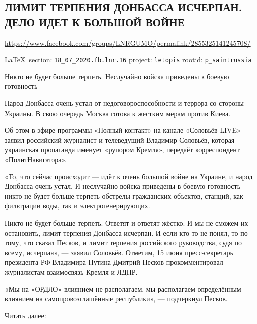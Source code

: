  
 

\subsection{ЛИМИТ ТЕРПЕНИЯ ДОНБАССА ИСЧЕРПАН. ДЕЛО ИДЕТ К БОЛЬШОЙ ВОЙНЕ}
\label{sec:18_07_2020.fb.lnr.16}
\url{https://www.facebook.com/groups/LNRGUMO/permalink/2855325141245708/}
  
\vspace{0.5cm}
{\small\LaTeX~section: \verb|18_07_2020.fb.lnr.16| project: \verb|letopis| rootid: \verb|p_saintrussia|}
\vspace{0.5cm}

Никто не будет больше терпеть. Неслучайно войска приведены в боевую готовность

Народ Донбасса очень устал от недоговороспособности и террора со стороны Украины.
В свою очередь Москва готова к жестким мерам против Киева.

Об этом в эфире программы «Полный контакт» на канале «Соловьёв LIVE» заявил российский журналист и телеведущий Владимир Соловьёв, которая украинская пропаганда именует «рупором Кремля», передаёт корреспондент «ПолитНавигатора».

«То, что сейчас происходит --- идёт к очень большой войне на Украине, и народ Донбасса очень устал.
И неслучайно войска приведены в боевую готовность --- никто не будет больше терпеть обстрелы гражданских объектов, станций, как фильтрации воды, так и электрогенерирующих.

Никто не будет больше терпеть. Ответят и ответят жёстко.
И мы не сможем их остановить, лимит терпения Донбасса исчерпан.
И если кто-то не понял, то по тому, что сказал Песков, и лимит терпения российского руководства, судя по всему, исчерпан», --- заявил Соловьёв.
Отметим, 15 июня пресс-секретарь президента РФ Владимира Путина Дмитрий Песков прокомментировал журналистам взаимосвязь Кремля и ЛДНР.

«Мы на «ОРДЛО» влиянием не располагаем, мы располагаем определённым влиянием на самопровозглашённые республики», --- подчеркнул Песков.

Читать далее:  
